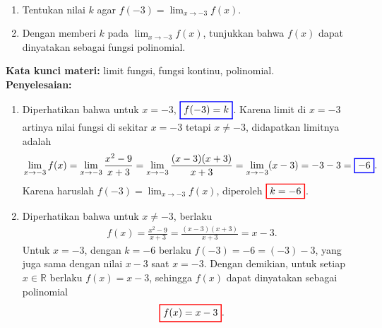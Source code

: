 \documentclass[10pt,openany,a4paper]{article}
\theoremstyle{definition}
\theoremstyle{definition}
\theoremstyle{plain}
\newenvironment{jawab}[2][tes]{%
\par\noindent\textbf{Kata kunci materi:} #1.\\
\textbf{Penyelesaian:} #2%
}{}
\begin{document}
\begin{enumerate}
\begin{align*}
            \end{align*}
            \begin{enumerate}
                \item Tentukan nilai $k$ agar $f(-3)=\displaystyle\lim_{x\to -3} f(x)$.
                \item Dengan memberi $k$ pada $\displaystyle\lim_{x\to-3} f(x)$, tunjukkan bahwa $f(x)$ dapat dinyatakan sebagai fungsi polinomial.
            \end{enumerate}
            \begin{jawab}[limit fungsi, fungsi kontinu, polinomial]{
                \begin{enumerate}
                    \item Diperhatikan bahwa untuk \(x = -3\), \(\colorlet{oldcolor}{.}
        \color{blue}
        \setlength{\fboxrule}{1pt} \boxed{\color{oldcolor}f(-3) = k}\color{oldcolor}\). Karena limit di $x=-3$ artinya nilai fungsi di sekitar $x=-3$ tetapi $x\neq -3$, didapatkan limitnya adalah
                    \begin{align*}
                        \lim_{x \to -3} f(x) = \lim_{x \to -3} \frac{x^2 - 9}{x + 3} = \lim_{x \to -3} \frac{(x-3)(x+3)}{x+3} = \lim_{x \to -3} (x-3) = -3-3 = \colorlet{oldcolor}{.}
        \color{blue}
        \setlength{\fboxrule}{1pt} \boxed{\color{oldcolor}-6}\color{oldcolor}.
                    \end{align*}
                    Karena haruslah $\displaystyle f(-3)=\lim_{x\to -3} f(x)$, diperoleh $\colorlet{oldcolor}{.}
        \color{red}
        \setlength{\fboxrule}{1pt} \boxed{\color{oldcolor}k=-6}\color{oldcolor}$.
                    \item Diperhatikan bahwa untuk $x\neq -3$, berlaku
                    \begin{align*}
                        f(x) = \frac{x^2 - 9}{x + 3} = \frac{(x-3)(x+3)}{x+3} = x - 3.
                    \end{align*}
                    Untuk $x=-3$, dengan $k=-6$ berlaku $f(-3)=-6=(-3)-3$, yang juga sama dengan nilai $x-3$ saat $x=-3$. Dengan demikian, untuk setiap $x\in\mathbb{R}$ berlaku $f(x)=x-3$, sehingga $f(x)$ dapat dinyatakan sebagai polinomial
                    \begin{align*}
                        \colorlet{oldcolor}{.}
        \color{red}
        \setlength{\fboxrule}{1pt} \boxed{\color{oldcolor}f(x) = x - 3}\color{oldcolor}.
                    \end{align*}
                \end{enumerate}
}
\end{jawab}
\end{enumerate}
\end{document}
